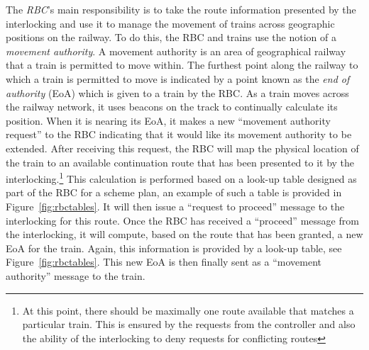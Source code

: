 The \emph{RBC}'s main responsibility is to take the route information
presented by the interlocking and use it to manage the movement of
trains across geographic positions on the railway. To do this, the RBC
and trains use the notion of a \emph{movement authority}. A movement
authority is an area of geographical railway that a train is permitted
to move within. The furthest point along the railway to which a train
is permitted to move is indicated by a point known as the \emph{end of
  authority} (EoA) which is given to a train by the RBC. As a train
moves across the railway network, it uses beacons on the track to
continually calculate its position. When it is nearing its EoA, it
makes a new ``movement authority request'' to the RBC indicating that
it would like its movement authority to be extended. After receiving
this request, the RBC will map the physical location of the train to
an available continuation route that has been presented to it by the
interlocking.\footnote{At this point, there should be maximally one
  route available that matches a particular train. This is ensured by
  the requests from the controller and also the ability of the
  interlocking to deny requests for conflicting routes} This
calculation is performed based on a look-up table designed as part of
the RBC for a scheme plan, an example of such a table is provided in
Figure~\ref{fig:rbctables}. It will then issue a ``request to
proceed'' message to the interlocking for this route. Once the RBC has
received a ``proceed'' message from the interlocking, it will compute,
based on the route that has been granted, a new EoA for the
train. Again, this information is provided by a look-up table, see
Figure~\ref{fig:rbctables}. This new EoA is then finally sent as a
``movement authority'' message to the train.

